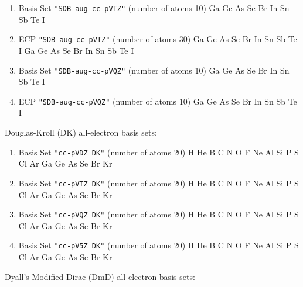 \begin{enumerate}
\item Basis Set \verb#"SDB-aug-cc-pVTZ"# (number of atoms 10)  \newline
  Ga Ge As Se Br In Sn Sb Te I


\item ECP \verb#"SDB-aug-cc-pVTZ"# (number of atoms 30)  \newline
  Ga Ge As Se Br In Sn Sb Te I           Ga Ge As Se Br
 In Sn Sb Te I


\item Basis Set \verb#"SDB-aug-cc-pVQZ"# (number of atoms 10)  \newline
  Ga Ge As Se Br In Sn Sb Te I


\item ECP \verb#"SDB-aug-cc-pVQZ"# (number of atoms 10)  \newline
  Ga Ge As Se Br In Sn Sb Te I

\end{enumerate}

Douglas-Kroll (DK) all-electron basis sets:

\begin{enumerate}

\item Basis Set \verb#"cc-pVDZ DK"# (number of atoms 20)  \newline 
  H He B C N O F Ne Al Si P S Cl Ar Ga Ge As Se Br Kr


\item Basis Set \verb#"cc-pVTZ DK"# (number of atoms 20)  \newline 
  H He B C N O F Ne Al Si P S Cl Ar Ga Ge As Se Br Kr


\item Basis Set \verb#"cc-pVQZ DK"# (number of atoms 20)  \newline 
  H He B C N O F Ne Al Si P S Cl Ar Ga Ge As Se Br Kr


\item Basis Set \verb#"cc-pV5Z DK"# (number of atoms 20)  \newline 
  H He B C N O F Ne Al Si P S Cl Ar Ga Ge As Se Br Kr

\end{enumerate}

Dyall's Modified Dirac (DmD) all-electron basis sets:

